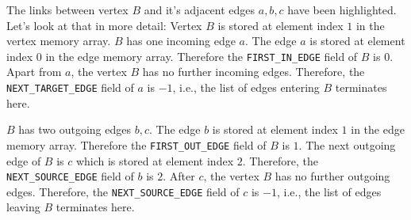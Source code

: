 \begin{center}
\end{center}
The links between vertex $B$ and it's adjacent edges $a, b, c$ have been highlighted.
Let's look at that in more detail:
Vertex $B$ is stored at element index $1$ in the vertex memory array.
$B$ has one incoming edge $a$.
The edge $a$ is stored at element index $0$ in the edge memory array.
Therefore the \texttt{FIRST\_IN\_EDGE} field of $B$ is $0$.
%
Apart from $a$, the vertex $B$ has no further incoming edges.
Therefore, the \texttt{NEXT\_TARGET\_EDGE} field of $a$ is $-1$, i.e., the list of edges entering $B$ terminates here.

$B$ has two outgoing edges $b, c$.
The edge $b$ is stored at element index $1$ in the edge memory array.
Therefore the \texttt{FIRST\_OUT\_EDGE} field of $B$ is $1$.
%
The next outgoing edge of $B$ is $c$ which is stored at element index $2$.
Therefore, the \texttt{NEXT\_SOURCE\_EDGE} field of $b$ is $2$.
After $c$, the vertex $B$ has no further outgoing edges.
Therefore, the \texttt{NEXT\_SOURCE\_EDGE} field of $c$ is $-1$, i.e., the list of edges leaving $B$ terminates here.

